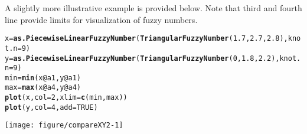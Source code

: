 \documentclass[11pt]{article}\usepackage[]{graphicx}\usepackage[]{color}
\makeatletter
\newcommand{\hlnum}[1]{\textcolor[rgb]{0.686,0.059,0.569}{#1}}%
\newcommand{\hlopt}[1]{\textcolor[rgb]{0,0,0}{#1}}%
\newcommand{\hlstd}[1]{\textcolor[rgb]{0.345,0.345,0.345}{#1}}%
\newcommand{\hlkwb}[1]{\textcolor[rgb]{0.69,0.353,0.396}{#1}}%
\newcommand{\hlkwc}[1]{\textcolor[rgb]{0.333,0.667,0.333}{#1}}%
\newcommand{\hlkwd}[1]{\textcolor[rgb]{0.737,0.353,0.396}{\textbf{#1}}}%
\newenvironment{kframe}{%
 \def\at@end@of@kframe{}%
 \ifinner\ifhmode%
  \def\at@end@of@kframe{\end{minipage}}%
  \begin{minipage}{\columnwidth}%
 \fi\fi%
 \def\FrameCommand##1{\hskip\@totalleftmargin \hskip-\fboxsep
 \colorbox{shadecolor}{##1}\hskip-\fboxsep
     \hskip-\linewidth \hskip-\@totalleftmargin \hskip\columnwidth}%
 \MakeFramed {\advance\hsize-\width
   \@totalleftmargin\z@ \linewidth\hsize
   \@setminipage}}%
 {\par\unskip\endMakeFramed%
 \at@end@of@kframe}
\newenvironment{knitrout}{}{} %
\makeatother
\begin{document}
A slightly more illustrative example is provided below. Note that third and fourth line provide limits for visualization of fuzzy numbers.
\begin{knitrout}\small
{}\color{fgcolor}\begin{kframe}
\begin{alltt}
\hlstd{x} \hlkwb{=} \hlkwd{as.PiecewiseLinearFuzzyNumber}\hlstd{(}\hlkwd{TriangularFuzzyNumber}\hlstd{(}\hlnum{1.7}\hlstd{,} \hlnum{2.7}\hlstd{,} \hlnum{2.8}\hlstd{),} \hlkwc{knot.n} \hlstd{=} \hlnum{9}\hlstd{)}
\hlstd{y} \hlkwb{=} \hlkwd{as.PiecewiseLinearFuzzyNumber}\hlstd{(}\hlkwd{TriangularFuzzyNumber}\hlstd{(}\hlnum{0}\hlstd{,} \hlnum{1.8}\hlstd{,} \hlnum{2.2}\hlstd{),} \hlkwc{knot.n} \hlstd{=} \hlnum{9}\hlstd{)}
\hlstd{min} \hlkwb{=} \hlkwd{min}\hlstd{(x}\hlopt{@}\hlkwc{a1}\hlstd{,y}\hlopt{@}\hlkwc{a1}\hlstd{)}
\hlstd{max} \hlkwb{=} \hlkwd{max}\hlstd{(x}\hlopt{@}\hlkwc{a4}\hlstd{,y}\hlopt{@}\hlkwc{a4}\hlstd{)}
\hlkwd{plot}\hlstd{(x,} \hlkwc{col}\hlstd{=}\hlnum{2}\hlstd{,} \hlkwc{xlim} \hlstd{=} \hlkwd{c}\hlstd{(min,max))}
\hlkwd{plot}\hlstd{(y,} \hlkwc{col}\hlstd{=}\hlnum{4}\hlstd{,} \hlkwc{add}\hlstd{=}\hlnum{TRUE}\hlstd{)}
\end{alltt}
\end{kframe}

{\centering \texttt{[image: figure/compareXY2-1]} 

}



\end{knitrout}
\end{document}
